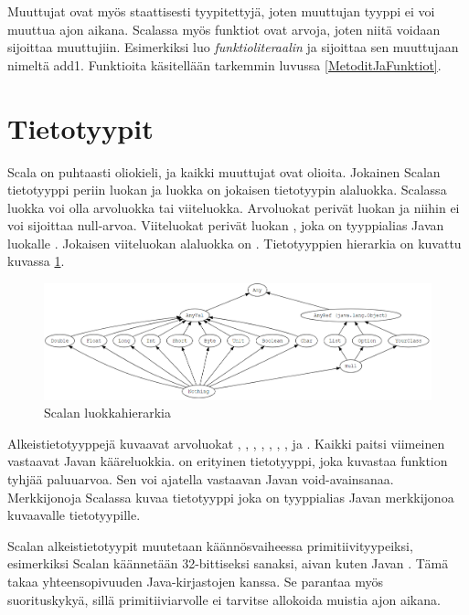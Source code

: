 Muuttujat ovat myös staattisesti tyypitettyjä, joten muuttujan tyyppi ei voi muuttua ajon aikana. Scalassa myös funktiot ovat arvoja, joten niitä voidaan sijoittaa muuttujiin. Esimerkiksi  luo \textit{funktioliteraalin} ja sijoittaa sen muuttujaan nimeltä add1. Funktioita käsitellään tarkemmin luvussa \ref{MetoditJaFunktiot}.
\cite[Luku 1]{prorgrammingInScala3rd}


\section{Tietotyypit}
Scala on puhtaasti oliokieli, ja kaikki muuttujat ovat olioita. Jokainen Scalan tietotyyppi periin luokan  ja luokka  on jokaisen tietotyypin alaluokka. Scalassa luokka voi olla arvoluokka tai viiteluokka. Arvoluokat perivät luokan  ja niihin ei voi sijoittaa null-arvoa. Viiteluokat perivät luokan , joka on tyyppialias Javan luokalle . Jokaisen viiteluokan alaluokka on . Tietotyyppien hierarkia on kuvattu kuvassa \ref{tyyppihierarkia}.
\cite[Luku 5]{prorgrammingInScala3rd}

\begin{figure}
    \centering \includegraphics[width=1\textwidth]{kuvat/typehierarchy}
    \caption{Scalan luokkahierarkia}
    \label{tyyppihierarkia}
\end{figure}

Alkeistietotyyppejä kuvaavat arvoluokat , , , , , , ,  ja . Kaikki paitsi viimeinen vastaavat Javan kääreluokkia.  on erityinen tietotyyppi, joka kuvastaa funktion tyhjää paluuarvoa. Sen voi ajatella vastaavan Javan void-avainsanaa. Merkkijonoja Scalassa kuvaa tietotyyppi  joka on tyyppialias Javan merkkijonoa kuvaavalle tietotyypille.
\cite[Luku 5]{prorgrammingInScala3rd}

Scalan alkeistietotyypit muutetaan käännösvaiheessa primitiivityypeiksi, esimerkiksi Scalan  käännetään 32-bittiseksi sanaksi, aivan kuten Javan . Tämä takaa yhteensopivuuden Java-kirjastojen kanssa. Se parantaa myös suorituskykyä, sillä primitiiviarvolle ei tarvitse allokoida muistia ajon aikana.
\cite[Luku 6]{prorgrammingInScala3rd}


